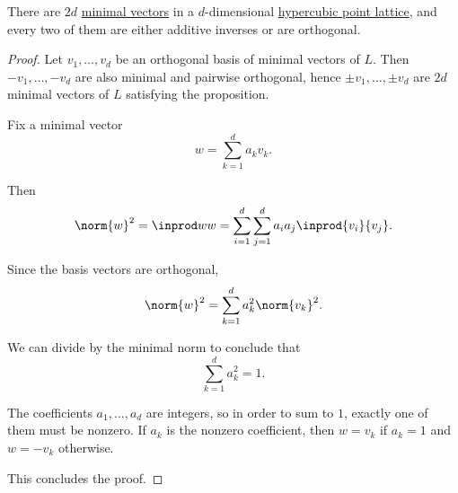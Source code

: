 \begin{proposition}\label{thm:hypercubic_point_lattice_minimal_vectors}
  There are \( 2d \) \hyperref[def:minimal_lattice_vector]{minimal vectors} in a \( d \)-dimensional \hyperref[def:hypercubic_point_lattice]{hypercubic point lattice}, and every two of them are either additive inverses or are orthogonal.
\end{proposition}
\begin{proof}
  Let \( v_1, \ldots, v_d \) be an orthogonal basis of minimal vectors of \( L \). Then \( -v_1, \ldots, -v_d \) are also minimal and pairwise orthogonal, hence \( \pm v_1, \ldots, \pm v_d \) are \( 2d \) minimal vectors of \( L \) satisfying the proposition.

  Fix a minimal vector
  \begin{equation*}
    w = \sum_{k=1}^d a_k v_k.
  \end{equation*}

  Then
  \begin{equation*}
    \norm{w}^2 = \inprod w w = \sum_{i=1}^d \sum_{j=1}^d a_i a_j \inprod {v_i} {v_j}.
  \end{equation*}

  Since the basis vectors are orthogonal,
  \begin{equation*}
    \norm{w}^2 = \sum_{k=1}^d a_k^2 \norm{v_k}^2.
  \end{equation*}

  We can divide by the minimal norm to conclude that
  \begin{equation*}
    \sum_{k=1}^d a_k^2 = 1.
  \end{equation*}

  The coefficients \( a_1, \ldots, a_d \) are integers, so in order to sum to \( 1 \), exactly one of them must be nonzero. If \( a_k \) is the nonzero coefficient, then \( w = v_k \) if \( a_k = 1 \) and \( w = -v_k \) otherwise.

  This concludes the proof.
\end{proof}

